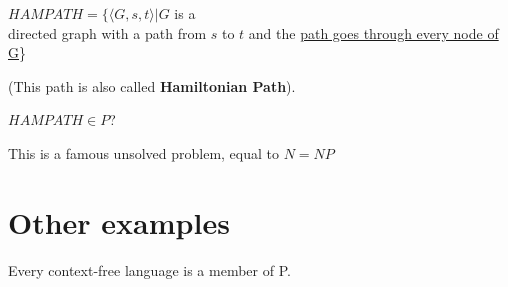 \begin{example}
    \(HAMPATH = \{\langle G, s, t \rangle  | G\) is a\\ directed graph with a path from \(s\) to \(t\) and the \underline{path goes through every node of G}\}

    (This path is also called \textbf{Hamiltonian Path}).


    \begin{problem}
        \(HAMPATH \in P\)? 

        \begin{remark}
            This is a famous unsolved problem, equal to \(N = NP\) 
        \end{remark}
    \end{problem}

\end{example}

\section{Other examples}

\begin{theorem}
    Every context-free language is a member of P.
\end{theorem}